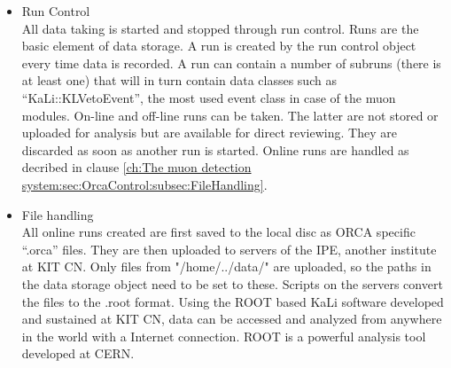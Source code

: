 \begin{itemize}
	\item Run Control\\
	All data taking is started and stopped through run control. Runs are the basic element of data storage. A run is created by the run control object every time data is recorded. A run can contain a number of subruns (there is at least one) that will in turn contain data classes such as ``KaLi::KLVetoEvent'', the most used event class in case of the muon modules. On-line and off-line runs can be taken. The latter are not stored or uploaded for analysis but are available for direct reviewing. They are discarded as soon as another run is started. Online runs are handled as decribed in clause \ref{ch:The muon detection system:sec:OrcaControl:subsec:FileHandling}.
	\item File handling\\
    All online runs created are first saved to the local disc as ORCA specific ``.orca'' files. They are then uploaded to servers of the IPE, another institute at KIT CN. Only files from "/home/../data/"  are uploaded, so the paths in the data storage object need to be set to these. Scripts on the servers convert the files to the .root format. Using the ROOT based KaLi software developed and sustained at KIT CN, data can be accessed and analyzed from anywhere in the world with a Internet connection. ROOT is a powerful analysis tool developed at CERN.


\end{itemize}
